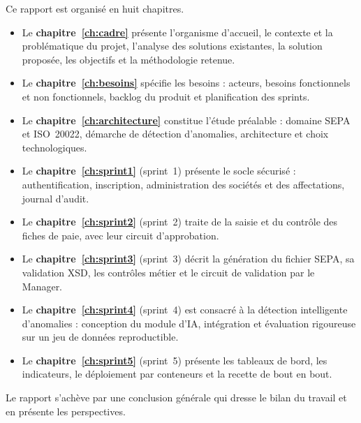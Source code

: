 Ce rapport est organisé en huit chapitres.
\begin{itemize}
    \item Le \textbf{chapitre~\ref{ch:cadre}} présente l'organisme d'accueil, le contexte et la problématique du projet, l'analyse des solutions existantes, la solution proposée, les objectifs et la méthodologie retenue.
    \item Le \textbf{chapitre~\ref{ch:besoins}} spécifie les besoins : acteurs, besoins fonctionnels et non fonctionnels, backlog du produit et planification des sprints.
    \item Le \textbf{chapitre~\ref{ch:architecture}} constitue l'étude préalable : domaine SEPA et ISO~20022, démarche de détection d'anomalies, architecture et choix technologiques.
    \item Le \textbf{chapitre~\ref{ch:sprint1}} (sprint~1) présente le socle sécurisé : authentification, inscription, administration des sociétés et des affectations, journal d'audit.
    \item Le \textbf{chapitre~\ref{ch:sprint2}} (sprint~2) traite de la saisie et du contrôle des fiches de paie, avec leur circuit d'approbation.
    \item Le \textbf{chapitre~\ref{ch:sprint3}} (sprint~3) décrit la génération du fichier SEPA, sa validation XSD, les contrôles métier et le circuit de validation par le Manager.
    \item Le \textbf{chapitre~\ref{ch:sprint4}} (sprint~4) est consacré à la détection intelligente d'anomalies : conception du module d'IA, intégration et évaluation rigoureuse sur un jeu de données reproductible.
    \item Le \textbf{chapitre~\ref{ch:sprint5}} (sprint~5) présente les tableaux de bord, les indicateurs, le déploiement par conteneurs et la recette de bout en bout.
\end{itemize}
Le rapport s'achève par une conclusion générale qui dresse le bilan du travail et en présente les perspectives.
